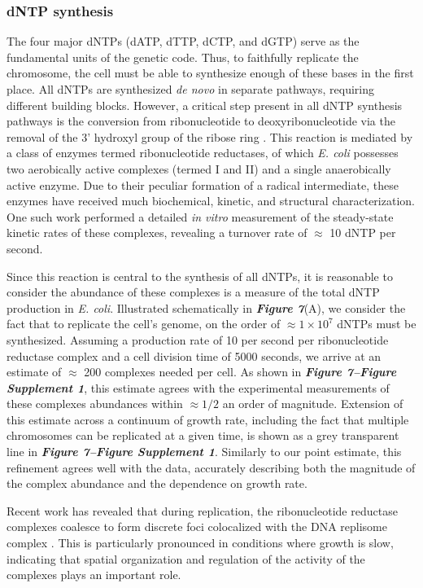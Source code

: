 \subsubsection{dNTP synthesis}
The four major dNTPs (dATP, dTTP, dCTP, and dGTP) serve as the fundamental
units of the genetic code. Thus, to faithfully replicate the chromosome, the
cell must be able to synthesize enough of these bases in the first place. All
dNTPs are synthesized \textit{de novo} in separate pathways, requiring
different building blocks. However, a critical step present in all dNTP
synthesis pathways is the conversion from ribonucleotide to
deoxyribonucleotide via the removal of the 3' hydroxyl group of the ribose
ring \citep{rudd2016}. This reaction is mediated by a class of enzymes termed
ribonucleotide reductases, of which \textit{E. coli} possesses two
aerobically active complexes (termed I and II) and a single anaerobically
active enzyme. Due to their peculiar formation of a radical intermediate,
these enzymes have received much biochemical, kinetic, and structural
characterization. One such work \citep{ge2003} performed a detailed
\textit{in vitro} measurement of the steady-state kinetic rates of these
complexes, revealing a turnover rate of $\approx$ 10 dNTP per second.

Since this reaction is central to the synthesis of all dNTPs, it is
reasonable to consider the abundance of these complexes is a measure of the
total dNTP production in \textit{E. coli}. Illustrated schematically in
\textbf{\textit{Figure 7}}(A), we consider the fact that to replicate the cell's
genome, on the order of $\approx 1\times 10^{7}$ dNTPs must be synthesized. Assuming a
production rate of 10 per second per ribonucleotide reductase complex and a
cell division time of 5000 seconds, we arrive at an estimate of $\approx$ 200
complexes needed per cell. As shown in \textbf{\textit{Figure 7–Figure Supplement 1}}, this estimate agrees with the experimental measurements of these
complexes abundances within $\approx 1/2$ an order of magnitude. Extension of
this estimate across a continuum of growth rate, including the fact that
multiple chromosomes can be replicated at a given time, is shown as a grey
transparent line in \textbf{\textit{Figure 7–Figure Supplement 1}}. Similarly to our point estimate, this
refinement agrees well with the data, accurately describing both the
magnitude of the complex abundance and the dependence on growth rate.

Recent work has revealed that during replication, the ribonucleotide
reductase complexes coalesce to form discrete foci colocalized with the DNA
replisome complex \citep{sanchez-romero2011}. This is particularly pronounced
in conditions where growth is slow, indicating that spatial organization and
regulation of the activity of the complexes plays an important role.

